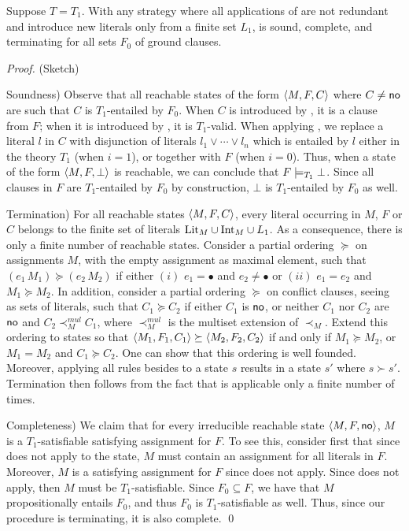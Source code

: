 \documentclass{svjour3}                     %
\begin{document}
\begin{thm}
\label{thm:dpllts-correct}
Suppose $T = T_1$.
With any strategy where all applications of  are not redundant and
introduce new literals only from a finite set $L_1$,
\dpllt is sound, complete, and terminating for all sets $F_0$ of ground clauses.
\end{thm}
\begin{proof}
(Sketch)

Soundness)
Observe that all reachable states of the form $\state{M,F,C}$ where $C \neq \none$
are such that $C$ is $T_1$-entailed by $F_0$.
When $C$ is introduced by , it is a clause from $F$;
when it is introduced by , it is $T_1$-valid.
When applying , we replace a literal $l$ in $C$ 
with disjunction of literals $l_1 \lor \cdots \lor l_n$
which is entailed by $l$ either in the theory $T_1$ (when $i = 1$), 
or together with $F$ (when $i=0$).
Thus, when a state of the form $\state{M,F,\bot}$ is reachable, 
we can conclude  that $F \ent[T_1] \bot$.
Since all clauses in $F$ are $T_1$-entailed by $F_0$ by construction, 
$\bot$ is $T_1$-entailed by $F_0$ as well.
\smallskip

Termination)
For all reachable states $\state{M,F,C}$, every literal occurring in $M$, $F$ or $C$ 
belongs to the finite set of literals $\lits{\Mc} \cup \ilits{\Mc} \cup L_1$.
As a consequence, there is only a finite number of reachable states.
Consider a partial ordering $\succeq$ on assignments $M$, with the empty assignment
as maximal element,
such that $(e_1\, M_1) \succeq (e_2\, M_2)$ 
if either 
$(i)$ $e_1 = \bullet$ and $e_2 \neq \bullet$ or 
$(ii)$ $e_1 = e_2$ and $M_1 \succeq M_2$.
In addition, 
consider a partial ordering $\succeq$ on conflict clauses, seeing as sets of literals, 
such that $C_1 \succeq C_2$ if either $C_1$ is $\none$, 
or neither $C_1$ nor $C_2$ are $\none$ and $C_2 \prec_M^{mul} C_1$, where $\prec_M^{mul}$ is the multiset extension of $\prec_M$.
Extend this ordering to states so that $\state{M_1,F_1,C_1} \succeq \state{M_2, F_2, C_2}$ if and only if
$M_1 \succeq M_2$, or $M_1 = M_2$ and $C_1 \succeq C_2$.
One can show that this ordering is well founded.
Moreover, applying all rules besides  to a state $s$ results in a state $s'$ where $s \succ s'$.
Termination then follows from the fact that  is applicable
only a finite number of times.
\smallskip

Completeness)
We claim that for every irreducible reachable state $\state{M,F,\none}$,
$M$ is a $T_1$-satisfiable satisfying assignment for $F$.
To see this, consider first that since \decide does not apply to the state,
$M$ must contain an assignment for all literals in $F$.
Moreover, $M$ is a satisfying assignment for $F$ since  does not apply.
Since  does not apply, then $M$ must be $T_1$-satisfiable.
Since $F_0 \subseteq F$, we have that $M$ propositionally entails $F_0$,
and thus $F_0$ is $T_1$-satisfiable as well.
Thus, since our procedure is terminating, it is also complete.
\qed
\end{proof}
\medskip
\end{document}
